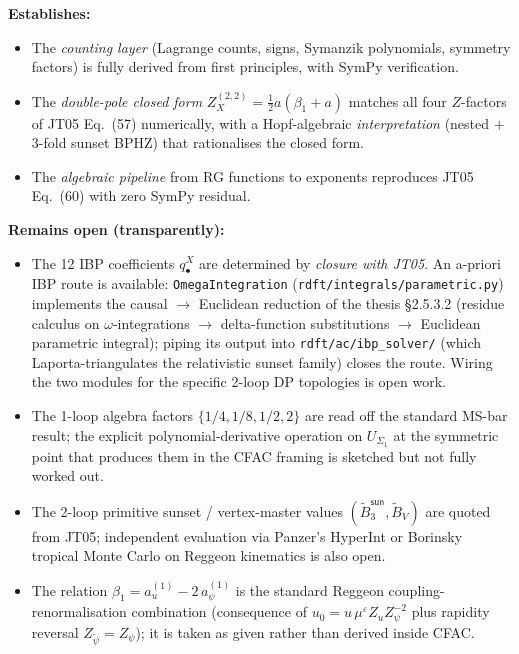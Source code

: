 \documentclass[11pt,a4paper]{article}
\theoremstyle{definition}
\theoremstyle{plain}
\begin{document}
\begin{cfacbox}
\textbf{Establishes:}
\begin{itemize}[leftmargin=2em,itemsep=1pt]
  \item The \emph{counting layer} (Lagrange counts, signs, Symanzik
    polynomials, symmetry factors) is fully derived from first
    principles, with SymPy verification.
  \item The \emph{double-pole closed form}
    $Z_X^{(2,2)} = \tfrac{1}{2} a (\beta_1 + a)$ matches all four
    $Z$-factors of JT05 Eq.~(57) numerically, with a Hopf-algebraic
    \emph{interpretation} (nested $+$ 3-fold sunset BPHZ) that
    rationalises the closed form.
  \item The \emph{algebraic pipeline} from RG functions to
    exponents reproduces JT05 Eq.~(60) with zero SymPy residual.
\end{itemize}

\textbf{Remains open (transparently):}
\begin{itemize}[leftmargin=2em,itemsep=1pt]
  \item The 12 IBP coefficients $q^X_\bullet$ are determined by
    \emph{closure with JT05}.  An a-priori IBP route is available:
    \texttt{OmegaIntegration} (\texttt{rdft/integrals/parametric.py})
    implements the causal $\to$ Euclidean reduction of the thesis
    \cite{amarteifio2019} \S 2.5.3.2 (residue calculus on
    $\omega$-integrations $\to$ delta-function substitutions $\to$
    Euclidean parametric integral); piping its output into
    \texttt{rdft/ac/ibp\_solver/} (which Laporta-triangulates the
    relativistic sunset family) closes the route.  Wiring the two
    modules for the specific 2-loop DP topologies is open work.
  \item The 1-loop algebra factors $\{1/4, 1/8, 1/2, 2\}$ are read
    off the standard MS-bar result; the explicit polynomial-derivative
    operation on $U_{\Sigma_1}$ at the symmetric point that produces
    them in the CFAC framing is sketched but not fully worked out.
  \item The 2-loop primitive sunset / vertex-master values
    $(\tilde B_3^{\textsf{sun}}, \tilde B_V)$ are quoted from JT05;
    independent evaluation via Panzer's HyperInt or Borinsky tropical
    Monte Carlo on Reggeon kinematics is also open.
  \item The relation $\beta_1 = a_u^{(1)} - 2\,a_\psi^{(1)}$ is the
    standard Reggeon coupling-renormalisation combination (consequence
    of $u_0 = u\,\mu^\varepsilon Z_u Z_\psi^{-2}$ plus rapidity
    reversal $Z_{\tilde\psi} = Z_\psi$); it is taken as given rather
    than derived inside CFAC.
\end{itemize}


\end{cfacbox}
\end{document}
